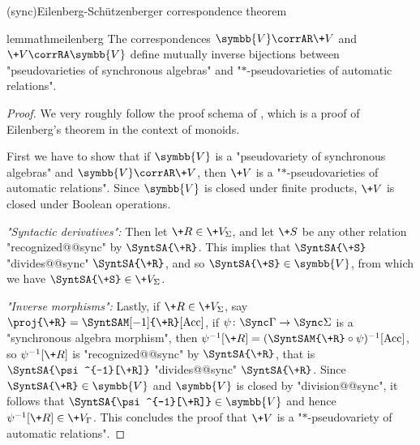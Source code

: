 \AP{}(sync){Eilenberg-Schützenberger correspondence theorem}\vspace{-1em}
\begin{restatable}{lemma}{thmeilenberg}
	\AP\label{lem:eilenberg-sy}
	The correspondences $\symbb{V} \corrAR \+V$ and $\+V \corrRA \symbb{V}$ define
	mutually inverse bijections between "pseudovarieties of
	synchronous algebras" and "$\ast$-pseudovarieties of automatic relations".
\end{restatable}

\begin{proof}
	We very roughly follow the proof schema of \cite[\S~XIII.4, pp.~226--229]{Pin2022MathematicalFoundations}, which is
	a proof of Eilenberg's theorem in the context of monoids.

	First we have to show that if $\symbb{V}$ is a "pseudovariety
	of synchronous algebras" and $\symbb{V} \corrAR \+V$, then $\+V$ is a
	"$\ast$-pseudovarieties of automatic relations".
	Since $\symbb{V}$ is closed under finite products, $\+V$ is closed under Boolean operations.

	\emph{"Syntactic derivatives":} Then let $\+R \in \+V_\Sigma$, and let $\+S$ be any other relation
	"recognized@@sync" by $\SyntSA{\+R}$. This implies that $\SyntSA{\+S}$
	"divides@@sync" $\SyntSA{\+R}$, and so $\SyntSA{\+S} \in \symbb{V}$, from which
	we have $\SyntSA{\+S} \in \+V_\Sigma$.

	\emph{"Inverse morphisms":} Lastly, if $\+R \in \+V_\Sigma$, say $\proj{\+R} = \SyntSAM[-1]{\+R}[\Acc]$,
	if $\psi\colon \Sync\Gamma \to \Sync\Sigma$ is a "synchronous algebra morphism",
	then $\psi^{-1}[\+R] = (\SyntSAM{\+R} \circ \psi)^{-1}[\Acc]$, so
	$\psi^{-1}[\+R]$ is "recognized@@sync" by $\SyntSA{\+R}$, that is
	$\SyntSA{\psi^{-1}[\+R]}$ "divides@@sync" $\SyntSA{\+R}$. Since $\SyntSA{\+R} \in \symbb{V}$
	and $\symbb{V}$ is closed by "division@@sync", it follows that $\SyntSA{\psi^{-1}[\+R]} \in \symbb{V}$
	and hence $\psi^{-1}[\+R] \in \+V_{\Gamma}$. 
	This concludes the proof that $\+V$ is a "$\ast$-pseudovariety of automatic relations".


\end{proof}
